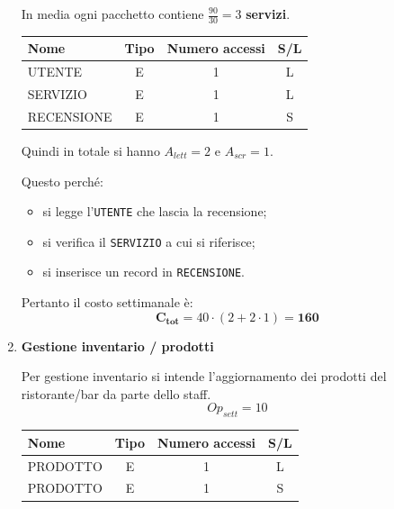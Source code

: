 \documentclass[a4paper,12pt]{report}
\begin{document}
\begin{enumerate}
	      In media ogni pacchetto contiene $\frac{90}{30}=3$ \textbf{servizi}.

	      \begin{table}[H]
		      \centering
		      \small
		      \renewcommand{\arraystretch}{1.15}
		      \begin{tabularx}{0.8\textwidth}{|X|c|c|c|}
			      \hline
			      \rowcolor{gray!20}
			      \textbf{Nome} & \textbf{Tipo} & \textbf{Numero accessi} & \textbf{S/L} \\
			      \hline
			      UTENTE        & E             & 1                       & L            \\
			      SERVIZIO      & E             & 1                       & L            \\
			      RECENSIONE    & E             & 1                       & S            \\
			      \hline
		      \end{tabularx}
	      \end{table}

	      Quindi in totale si hanno $A_{lett}=2$ e $A_{scr}=1$.

	      Questo perché:
	      \begin{itemize}
		      \item si legge l'\texttt{UTENTE} che lascia la recensione;
		      \item si verifica il \texttt{SERVIZIO} a cui si riferisce;
		      \item si inserisce un record in \texttt{RECENSIONE}.
	      \end{itemize}

	      Pertanto il costo settimanale è:
	      $$\mathbf{C_{tot}} = 40 \cdot (2 + 2 \cdot 1) = \mathbf{160}$$


	\item {\large \textbf{Gestione inventario / prodotti}} \label{op8}

	      Per gestione inventario si intende l'aggiornamento dei prodotti del ristorante/bar da parte dello staff.
	      $$
		      {Op}_{sett} = 10
	      $$

	      \begin{table}[H]
		      \centering
		      \small
		      \renewcommand{\arraystretch}{1.15}
		      \begin{tabularx}{0.8\textwidth}{|X|c|c|c|}
			      \hline
			      \rowcolor{gray!20}
			      \textbf{Nome} & \textbf{Tipo} & \textbf{Numero accessi} & \textbf{S/L} \\
			      \hline
			      PRODOTTO      & E             & 1                       & L            \\
			      PRODOTTO      & E             & 1                       & S            \\
			      \hline
		      \end{tabularx}
	      \end{table}


\end{enumerate}
\end{document}

